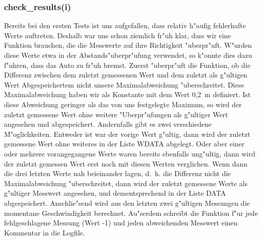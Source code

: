 \documentclass[a4paper,12pt]{article}
\begin{document}
\subsubsection{check\_results(i)}\label{sec2.2.5}

Bereits bei den ersten Tests ist uns aufgefallen, dass relativ h"aufig fehlerhafte Werte auftreten.
Deshalb war uns schon ziemlich fr"uh klar, dass wir eine Funktion brauchen, die die Messwerte auf ihre Richtigkeit "uberpr"uft.
W"urden diese Werte etwa in der Abstands"uberpr"ufung verwendet, so k"onnte dies dazu f"uhren, dass das Auto zu fr"uh bremst.
Zuerst "uberpr"uft die Funktion, ob die Differenz zwischen dem zuletzt gemessenen Wert und dem zuletzt als g"ultigen Wert Abgespeichertem nicht unsere Maximalabweichung "uberschreitet.
Diese Maximalabweichung haben wir als Konstante mit dem Wert 0,2~m definiert.
Ist diese Abweichung geringer als das von uns festgelegte Maximum, so wird der zuletzt gemessene Wert ohne weitere "Uberpr"ufungen als g"ultiger Wert angesehen und abgespeichert.
Andernfalls gibt es zwei verschiedene M"oglichkeiten.
Entweder ist war der vorige Wert g"ultig, dann wird der zuletzt gemessene Wert ohne weiteres in der Liste WDATA abgelegt.
Oder aber einer oder mehrere vorangegangene Werte waren bereits ebenfalls ung"ultig, dann wird der zuletzt gemessen Wert erst noch mit diesen Werten verglichen.
Wenn dann die drei letzten Werte nah beieinander lagen, d.~h. die Differenz nicht die Maximalabweichung "uberschreitet, dann wird der zuletzt gemessene Werte als g"ultiger Messwert angesehen, und dementsprechend in der Liste DATA abgespeichert.
Anschlie"send wird aus den letzten zwei g"ultigen Messungen die momentane Geschwindigkeit berechnet.
Au"serdem schreibt die Funktion f"ur jede fehlgeschlagene Messung (Wert -1) und jeden abweichenden Messwert einen Kommentar in die Logfile.
\end{document}
